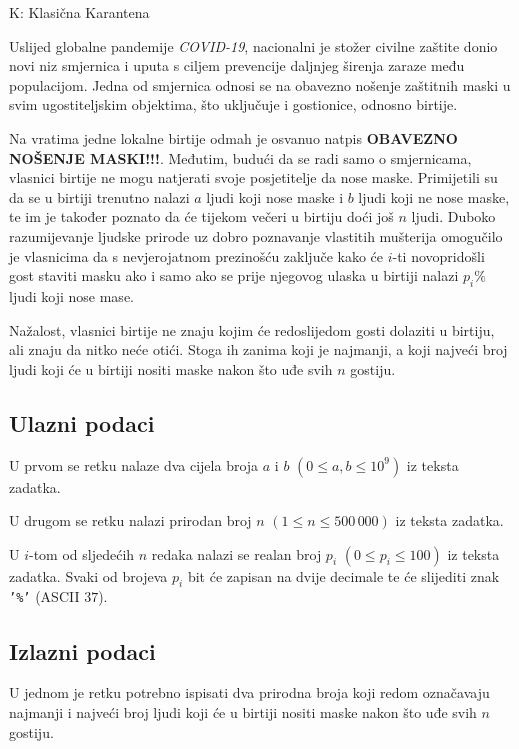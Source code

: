\begin{statement}[
  timelimit=1 s,
  memorylimit=512 MiB,
]{K: Klasična Karantena}

Uslijed globalne pandemije \textit{COVID-19}, nacionalni je stožer civilne
zaštite donio novi niz smjernica i uputa s ciljem prevencije daljnjeg širenja
zaraze među populacijom. Jedna od smjernica odnosi se na obavezno nošenje
zaštitnih maski u svim ugostiteljskim objektima, što uključuje i gostionice,
odnosno birtije.

Na vratima jedne lokalne birtije odmah je osvanuo natpis \textbf{OBAVEZNO
NOŠENJE MASKI!!!}. Međutim, budući da se radi samo o smjernicama, vlasnici
birtije ne mogu natjerati svoje posjetitelje da nose maske. Primijetili su da
se u birtiji trenutno nalazi $a$ ljudi koji nose maske i $b$ ljudi koji ne
nose maske, te im je također poznato da će tijekom večeri u birtiju doći još
$n$ ljudi. Duboko razumijevanje ljudske prirode uz dobro poznavanje vlastitih
mušterija omogučilo je vlasnicima da s nevjerojatnom prezinošću zaključe kako
će $i$-ti novopridošli gost staviti masku ako i samo ako se prije njegovog
ulaska u birtiji nalazi $p_i\%$ ljudi koji nose mase.

Nažalost, vlasnici birtije ne znaju kojim će redoslijedom gosti dolaziti u
birtiju, ali znaju da nitko neće otići. Stoga ih zanima koji je najmanji,
a koji najveći broj ljudi koji će u birtiji nositi maske nakon što uđe svih
$n$ gostiju.

\subsection*{Ulazni podaci}
U prvom se retku nalaze dva cijela broja $a$ i $b$ $(0 \le a, b \le 10^9)$ iz
teksta zadatka.

U drugom se retku nalazi prirodan broj $n$ $(1 \le n \le 500\,000)$ iz teksta
zadatka.

U $i$-tom od sljedećih $n$ redaka nalazi se realan broj $p_i$ $(0 \le p_i \le
100)$ iz teksta zadatka. Svaki od brojeva $p_i$ bit će zapisan na dvije
decimale te će slijediti znak \texttt{'\%'} (ASCII $37$).

\subsection*{Izlazni podaci}
U jednom je retku potrebno ispisati dva prirodna broja koji redom označavaju
najmanji i najveći broj ljudi koji će u birtiji nositi maske nakon što uđe
svih $n$ gostiju.


\end{statement}
